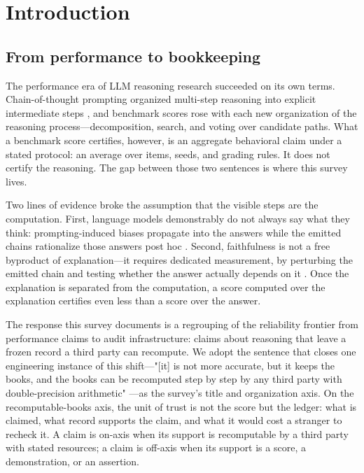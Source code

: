 \documentclass[11pt,a4paper]{article}
\begin{document}
\section{Introduction}

\subsection{From performance to bookkeeping}

The performance era of LLM reasoning research succeeded on its own terms. Chain-of-thought prompting organized multi-step reasoning into explicit intermediate steps \cite{key01}, and benchmark scores rose with each new organization of the reasoning process—decomposition, search, and voting over candidate paths. What a benchmark score certifies, however, is an aggregate behavioral claim under a stated protocol: an average over items, seeds, and grading rules. It does not certify the reasoning. The gap between those two sentences is where this survey lives.

Two lines of evidence broke the assumption that the visible steps are the computation. First, language models demonstrably do not always say what they think: prompting-induced biases propagate into the answers while the emitted chains rationalize those answers post hoc \cite{key02}. Second, faithfulness is not a free byproduct of explanation—it requires dedicated measurement, by perturbing the emitted chain and testing whether the answer actually depends on it \cite{key03}. Once the explanation is separated from the computation, a score computed over the explanation certifies even less than a score over the answer.

The response this survey documents is a regrouping of the reliability frontier from performance claims to audit infrastructure: claims about reasoning that leave a frozen record a third party can recompute. We adopt the sentence that closes one engineering instance of this shift—"[it] is not more accurate, but it keeps the books, and the books can be recomputed step by step by any third party with double-precision arithmetic" \cite{key04}—as the survey's title and organization axis. On the recomputable-books axis, the unit of trust is not the score but the ledger: what is claimed, what record supports the claim, and what it would cost a stranger to recheck it. A claim is on-axis when its support is recomputable by a third party with stated resources; a claim is off-axis when its support is a score, a demonstration, or an assertion.
\end{document}

